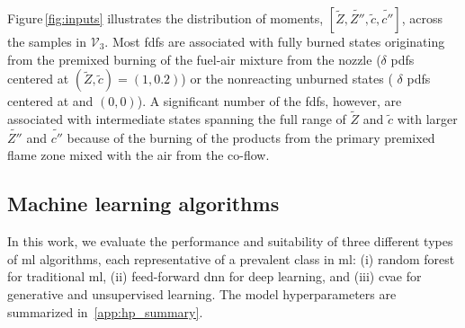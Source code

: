 \documentclass[review]{elsarticle}
\newcommand{\wt}[1]{\widetilde{#1}}
\begin{document}
Figure\,\ref{fig:inputs} illustrates the distribution of moments,
$\left[\wt{Z}, \wt{Z''}, \wt{c}, \wt{c''}\right]$, across the samples
in $\mathcal{V}_3$. Most \glspl{fdf} are associated with fully burned
states originating from the premixed burning of the fuel-air mixture
from the nozzle ($\delta$ \glspl{pdf} centered at $\left( \wt{Z}, \wt{c} \right) = (1,0.2)$) or the nonreacting unburned states (
$\delta$ \glspl{pdf} centered at
 and $(0,0)$). A significant number of the \glspl{fdf},
however, are associated with intermediate states spanning the full
range of $\wt{Z}$ and $\wt{c}$ with larger $\wt{Z''}$ and $\wt{c''}$
because of the burning of the products from the primary premixed flame
zone mixed with the air from the co-flow. 

\subsection{Machine learning algorithms}\label{sec:methods}
In this work, we evaluate the performance and suitability of three
different types of \gls{ml} algorithms, each representative of a
prevalent class in \gls{ml}: (i) random forest for traditional
\gls{ml}, (ii) feed-forward \gls{dnn} for deep learning, and (iii)
\gls{cvae} for generative and unsupervised learning. The model
hyperparameters are summarized in~\ref{app:hp_summary}.
\end{document}
